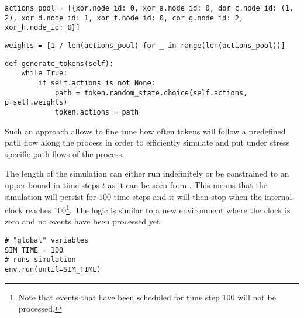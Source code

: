 \begin{lstlisting}[caption=Fixed actions pool consisting of different hashmaps each corresponding to a full path a token must follow during an instance. Keys correspond to node ids and values define which direction to take at gateways.,label=lst:actions_pool,style=CustomPython]
actions_pool = [{xor.node_id: 0, xor_a.node_id: 0, dor_c.node_id: (1, 2), xor_d.node_id: 1, xor_f.node_id: 0, cor_g.node_id: 2, xor_h.node_id: 0}]
\end{lstlisting}

\begin{lstlisting}[caption=Probability weights vector defining how often a path will be chosen. In this case equal probability is assigned to all paths in the action pool.,label=lst:probabilities_path_flow,style=CustomPython]
weights = [1 / len(actions_pool) for _ in range(len(actions_pool))]
\end{lstlisting}

\begin{lstlisting}[caption=Start event token generation method in which an action is being sampled from the action pool by accounting for its weighted probability.,label=lst:path_tokens_assignment,style=CustomPython]
def generate_tokens(self):
    while True:
        if self.actions is not None:
            path = token.random_state.choice(self.actions, p=self.weights)
            token.actions = path
\end{lstlisting}

Such an approach allows to fine tune how often tokens will follow a predefined path flow along the process in order to efficiently simulate and put under stress specific path flows of the process.

The length of the simulation can either run indefinitely or be constrained to an upper bound in time steps $t$ as it can be seen from . This means that the simulation will persist for $100$ time steps and it will then stop when the internal clock reaches $100$\footnote{Note that events that have been scheduled for time step $100$ will not be processed.}. The logic is similar to a new environment where the clock is zero and no events have been processed yet.

\begin{lstlisting}[caption=Discrete event simulation environment start by calling its corresponding run method with a discrete simulation time step $t$ set. In this case the simulation will run for $100$ time steps.,label=lst:simulation_steps,style=CustomPython]
# "global" variables
SIM_TIME = 100
# runs simulation
env.run(until=SIM_TIME)
\end{lstlisting}

